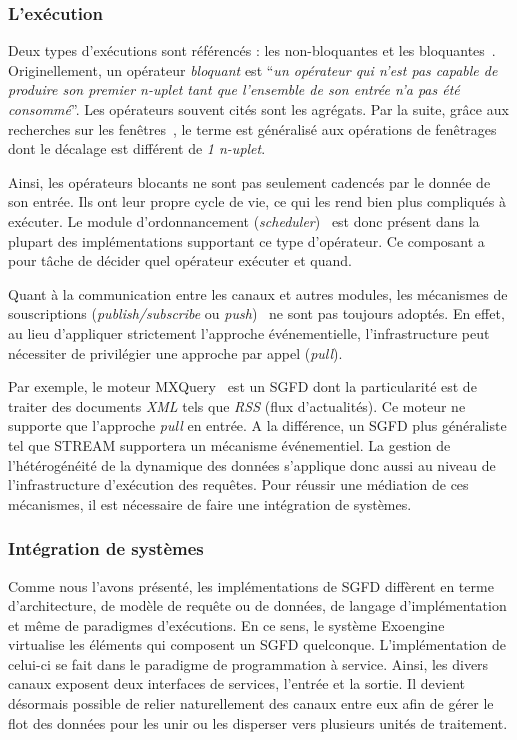 \subsubsection{L'exécution}
Deux types d'exécutions sont référencés : les non-bloquantes et les  bloquantes~\cite{Babcock:issues}. Originellement, un opérateur \textit{bloquant} est \enquote{\it un opérateur qui n'est pas capable de produire son premier n-uplet tant que l'ensemble de son entrée n'a pas été consommé}. Les opérateurs souvent cités sont les agrégats. Par la suite, grâce aux recherches sur les fenêtres~\cite{Maier:semantics}, le terme est généralisé aux opérations de fenêtrages dont le décalage est différent de \textit{1 n-uplet}.

Ainsi, les opérateurs blocants ne sont pas seulement cadencés par le donnée de son entrée. Ils ont leur propre cycle de vie, ce qui les rend bien plus compliqués à exécuter. Le module d'ordonnancement (\textit{scheduler})~\cite{Carney:scheduling} est donc présent dans la plupart des implémentations supportant ce type d'opérateur. Ce composant a pour tâche de décider quel opérateur exécuter et quand.

Quant à la communication entre les canaux et autres modules, les mécanismes de souscriptions (\textit{publish/subscribe} ou \textit{push})~\cite{Eugster:publishsubscribe} ne sont pas toujours adoptés. En effet, au lieu d'appliquer strictement l'approche événementielle, l'infrastructure peut nécessiter de privilégier une approche par appel (\textit{pull}). 

Par exemple, le moteur MXQuery~\cite{Botan:MXQuery} est un SGFD dont la particularité est de traiter des documents \textit{XML} tels que \textit{RSS} (flux d'actualités). Ce moteur ne supporte que l'approche \textit{pull} en entrée. A la différence, un SGFD plus généraliste tel que STREAM supportera un mécanisme événementiel. La gestion de l'hétérogénéité de la dynamique des données s'applique donc aussi au niveau de l'infrastructure d'exécution des requêtes. Pour réussir une médiation de ces mécanismes, il est nécessaire de faire une intégration de systèmes.

\subsubsection{Intégration de systèmes}
Comme nous l'avons présenté, les implémentations de SGFD diffèrent en terme d'architecture, de modèle de requête ou de données, de langage d'implémentation et même de paradigmes d'exécutions. En ce sens, le système Exoengine~\cite{Duller:virtualdsms} virtualise les éléments qui composent un SGFD quelconque. L'implémentation de celui-ci se fait dans le paradigme de programmation à service. Ainsi, les divers canaux exposent deux interfaces de services, l'entrée et la sortie. Il devient désormais possible de relier naturellement des canaux entre eux afin de gérer le flot des données pour les unir ou les disperser vers plusieurs unités de traitement.

